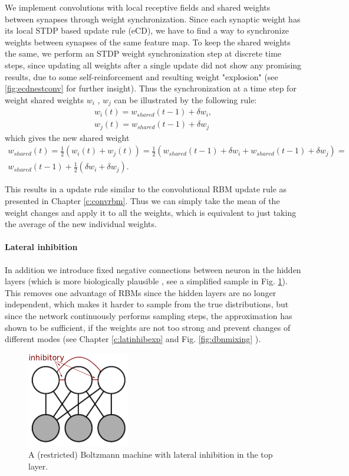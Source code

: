We implement convolutions with local receptive fields and shared weights between synapses through weight synchronization.
Since each synaptic weight has its local STDP based update rule (eCD), we have to find a way to synchronize weights between synapses of the same feature map.
To keep the shared weights the same, we perform an STDP weight synchronization step at discrete time steps, since updating all weights after a single update did not show any promising results, due to some self-reinforcement and resulting weight "explosion" (see \ref{fig:ecdnestconv} for further insight).
Thus the synchronization at a time step for weight shared weights $w_i$ , $w_j$ can be illustrated by the following rule:  
\[
\begin{split}
w_i(t) = w_{shared}(t-1) + \delta w_i, \\ 
w_j(t) = w_{shared}(t-1) + \delta w_j 
\end{split}
\]
which gives the new shared weight
\[
\begin{split}
w_{shared}(t) = \frac{1}{2} (w_i(t) + w_j(t) ) = \frac{1}{2} (w_{shared}(t-1) + \delta w_i + w_{shared}(t-1) + \delta w_j) = \\ w_{shared}(t-1) + \frac{1}{2} (\delta w_i + \delta w_j).
\end{split}
\]

This results in a update rule similar to the convolutional RBM update rule as presented in Chapter \ref{c:convrbm}.
Thus we can simply take the mean of the weight changes and apply it to all the weights, which is equivalent to just taking the average of the new individual weights. 

\paragraph{Lateral inhibition} \label{c:latinhib}
In addition we introduce fixed negative connections between neuron in the hidden layers (which is more biologically plausible \cite{King2013}, see a simplified sample in Fig. \ref{fig:bminhib}).
This removes one advantage of RBMs since the hidden layers are no longer independent, which makes it harder to sample from the true distributions, but since the network continuously performs sampling steps, the approximation has shown to be sufficient, if the weights are not too strong and prevent changes of different modes (see Chapter \ref{c:latinhibexp} and Fig. \ref{fig:dbnmixing} ).

\begin{figure}
	\centering
    	\includegraphics[width=0.4\textwidth]{imgs/lateral_inhib.png} 
    \caption{A (restricted) Boltzmann machine with lateral inhibition in the top layer.}
	\label{fig:bminhib}
\end{figure}


